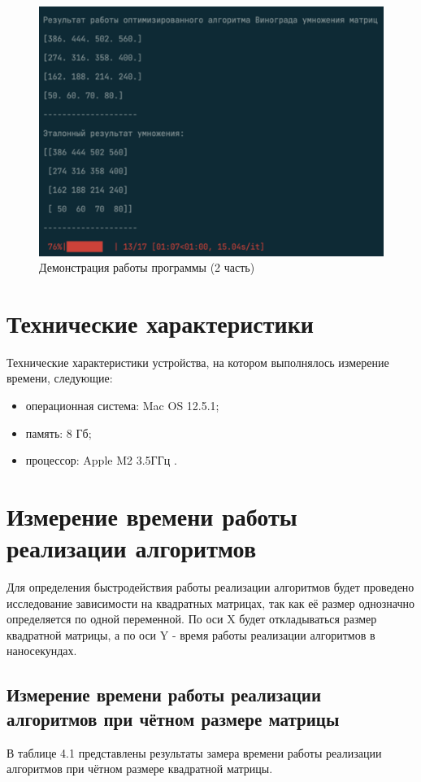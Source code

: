 \begin{figure}
	\begin{center}
	\includegraphics[]{inc/demonstrate_2.png}
	\end{center}
	\caption{Демонстрация работы программы (2 часть)}
\end{figure}
\FloatBarrier

\section{Технические характеристики}
Технические характеристики устройства, на котором выполнялось измерение времени, следующие:
\begin{itemize}
	\item операционная система: Mac OS 12.5.1;
	\item память: 8 Гб;
	\item процессор: Apple M2 3.5ГГц \cite{intel}.
\end{itemize}

\section{Измерение времени работы реализации алгоритмов}
Для определения быстродействия работы реализации алгоритмов будет проведено исследование зависимости
на квадратных матрицах, так как её размер однозначно определяется по одной переменной. 
По оси X будет откладываться размер квадратной матрицы, а по оси Y - время работы реализации алгоритмов
в наносекундах.

\subsection{Измерение времени работы реализации алгоритмов при чётном размере матрицы}
В таблице 4.1 представлены результаты замера времени работы реализации алгоритмов при чётном размере
квадратной матрицы.

